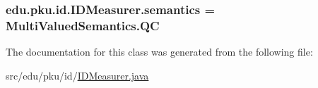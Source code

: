 \label{classedu_1_1pku_1_1id_1_1_i_d_measurer_a5955b5897c93bd335f41b8c45ef1365e}
\hypertarget{classedu_1_1pku_1_1id_1_1_i_d_measurer_a525c9e5ca2233b8509ec1133ee9e86c2}{
\subsubsection[{semantics}]{ {\bf edu.pku.id.IDMeasurer.semantics} = MultiValuedSemantics.QC}}
\label{classedu_1_1pku_1_1id_1_1_i_d_measurer_a525c9e5ca2233b8509ec1133ee9e86c2}


The documentation for this class was generated from the following file:\begin{DoxyCompactItemize}
\item 
src/edu/pku/id/\hyperlink{_i_d_measurer_8java}{IDMeasurer.java}\end{DoxyCompactItemize}
